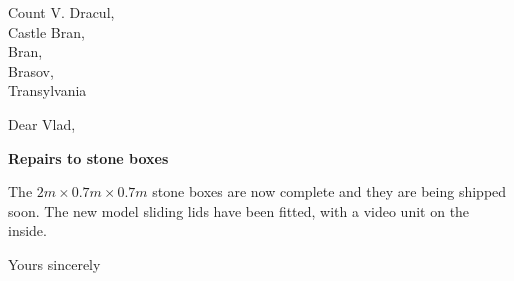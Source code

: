 \documentclass[11pt]{letter}
\date{October 31, 2000}
\begin{document}
\begin{letter}{Count V. Dracul, \\
          Castle Bran, \\
           Bran,  \\
Brasov,\\
  Transylvania}


\rm
\opening{Dear  Vlad,}
\begin{center}
{\bf  Repairs to stone boxes}
\end{center} \rm
The $2m\times 0.7m\times 0.7m$ stone boxes are now complete
and they are being shipped soon. The new model sliding
lids have been fitted, with a video unit
on the inside.




 \closing{Yours sincerely}


\end{letter}
\end{document}
